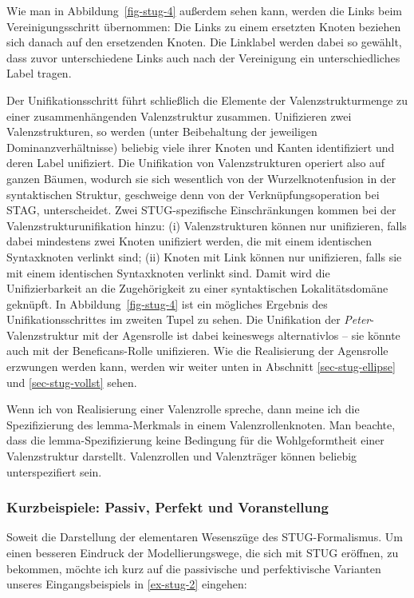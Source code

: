 Wie man in Abbildung~\ref{fig-stug-4} au\ss erdem sehen kann, werden die Links beim Vereinigungsschritt übernommen: Die Links zu einem ersetzten Knoten beziehen sich danach auf den ersetzenden Knoten. Die Linklabel werden dabei so gewählt, dass zuvor unterschiedene Links auch nach der Vereinigung ein unterschiedliches Label tragen. 

Der Unifikationsschritt führt schlie\ss lich die Elemente der Valenzstrukturmenge zu einer zusammenhängenden Valenzstruktur zusammen. Unifizieren zwei Valenzstrukturen, so werden (unter Beibehaltung der jeweiligen Dominanzverhältnisse) beliebig viele ihrer Knoten und Kanten identifiziert und deren Label unifiziert. Die Unifikation von Valenzstrukturen operiert also auf ganzen Bäumen, wodurch sie sich wesentlich von der Wurzelknotenfusion in der syntaktischen Struktur, geschweige denn von der Verknüpfungsoperation bei STAG, unterscheidet. Zwei STUG-spezifische Einschränkungen kommen bei der Valenzstrukturunifikation hinzu: (i) Valenzstrukturen können nur unifizieren, falls dabei mindestens zwei Knoten unifiziert werden, die mit einem identischen Syntaxknoten verlinkt sind; (ii) Knoten mit Link können nur unifizieren, falls sie mit einem identischen Syntaxknoten verlinkt sind. Damit wird die Unifizierbarkeit an die Zugehörigkeit zu einer syntaktischen Lokalitätsdomäne geknüpft. In Abbildung~\ref{fig-stug-4} ist ein mögliches Ergebnis des Unifikationsschrittes im zweiten Tupel zu sehen. Die Unifikation der {\it Peter}-Valenzstruktur mit der Agensrolle ist dabei keineswegs alternativlos -- sie könnte auch mit der Beneficans-Rolle unifizieren. Wie die Realisierung der Agensrolle erzwungen werden kann, werden wir weiter unten in Abschnitt \ref{sec-stug-ellipse} und \ref{sec-stug-vollst} sehen.


\clearpage 

Wenn ich von Realisierung einer Valenzrolle spreche, dann meine ich die Spezifizierung des {\sc lemma}-Merkmals in einem Valenzrollenknoten. Man beachte, dass die {\sc lemma}-Spezifizie\-rung keine Bedingung für die Wohlgeformtheit einer Valenzstruktur darstellt. Valenzrollen und Valenzträger können beliebig unterspezifiert sein.


\subsubsection*{Kurzbeispiele: Passiv, Perfekt und Voranstellung}

Soweit die Darstellung der elementaren Wesenszüge des STUG-Formalismus. Um einen besseren Eindruck der Modellierungswege, die sich mit STUG eröffnen, zu bekommen, möchte ich kurz auf die passivische und perfektivische Varianten unseres Eingangsbeispiels in \ref{ex-stug-2} eingehen:

